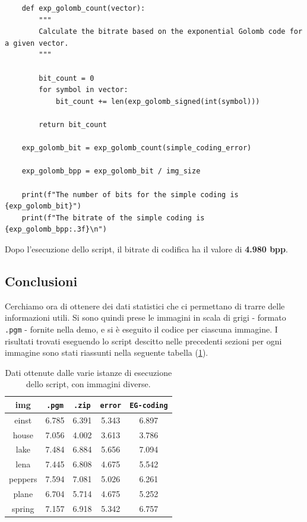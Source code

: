 \begin{lstlisting}
    def exp_golomb_count(vector):
        """
        Calculate the bitrate based on the exponential Golomb code for a given vector.
        """

        bit_count = 0
        for symbol in vector:
            bit_count += len(exp_golomb_signed(int(symbol)))

        return bit_count

    exp_golomb_bit = exp_golomb_count(simple_coding_error) 

    exp_golomb_bpp = exp_golomb_bit / img_size

    print(f"The number of bits for the simple coding is {exp_golomb_bit}")
    print(f"The bitrate of the simple coding is {exp_golomb_bpp:.3f}\n")
\end{lstlisting}

\noindent Dopo l'esecuzione dello script, il bitrate di codifica ha il valore di \textbf{4.980 bpp}.


\subsection{Conclusioni}
Cerchiamo ora di ottenere dei dati statistici che ci permettano di trarre delle informazioni utili. Si sono quindi prese le immagini in scala di grigi - formato \texttt{.pgm} - fornite nella demo, e si è eseguito il codice per ciascuna immagine. I risultati trovati eseguendo lo script descitto nelle precedenti sezioni per ogni immagine sono stati riassunti nella seguente tabella (\ref{tab:simple-conclusions}).


\begin{table}[h]
    \centering
    \renewcommand{\arraystretch}{1.5}
    \begin{tabular}{ | c | c c c c | }
        \hline
        \textbf{img} & \texttt{.pgm} & \texttt{.zip} & \texttt{error} & \texttt{EG-coding} \\\hline\hline

        einst & 6.785  & 6.391 & 5.343 & 6.897 \\

        house & 7.056  & 4.002 & 3.613 & 3.786 \\

        lake & 7.484  & 6.884 & 5.656 & 7.094 \\

        lena & 7.445  & 6.808 & 4.675 & 5.542 \\

        peppers & 7.594  & 7.081 & 5.026 & 6.261 \\

        plane & 6.704  & 5.714 & 4.675 & 5.252 \\

        spring & 7.157 & 6.918 & 5.342 & 6.757 \\
        \hline

    \end{tabular}
    \caption{Dati ottenute dalle varie istanze di esecuzione dello script, con immagini diverse.}
    \label{tab:simple-conclusions}
    \renewcommand{\arraystretch}{1}
\end{table}

